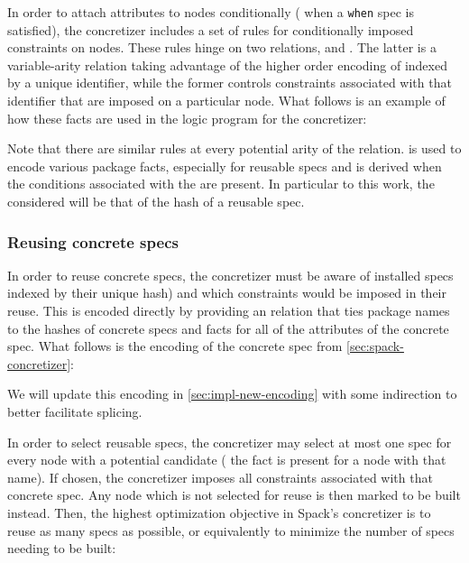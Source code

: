 In order to attach attributes to nodes conditionally (\ie{} when a
\texttt{when} spec is satisfied), the concretizer includes a set of rules for
conditionally imposed constraints on nodes. These rules hinge on two relations,
 and . The latter is a variable-arity
relation taking advantage of the higher order encoding of  indexed by
a unique identifier, while the former controls constraints associated with that
identifier that are imposed on a particular node. What follows is an example of how
these facts are used in the logic program for the concretizer:
\par\vspace{0.8em}\noindent\colorbox{whitesmoke}{\begin{minipage}{0.98\columnwidth}\end{minipage}}\vspace{0.8em}
Note that there are similar rules at every potential arity of the 
relation.  is used to encode various package facts,
especially for reusable specs and  is derived when the conditions
associated with the  are present. In particular to this work, the
 considered will be that of the hash of a reusable spec.

\subsubsection{Reusing concrete specs}
\label{sec:concretizer-reuse}
In order to reuse concrete specs, the concretizer must be aware of installed specs
indexed by their unique hash) and which constraints would
be imposed in their reuse. This is encoded directly by providing an
 relation that ties package names to the hashes of
concrete specs and  facts for all of the attributes
of the concrete spec. What follows is the encoding of the concrete spec from
\cref{sec:spack-concretizer}:
\par\vspace{0.8em}\noindent\colorbox{whitesmoke}{\begin{minipage}{0.98\columnwidth}\end{minipage}}\vspace{0.8em}
We will update this encoding in \cref{sec:impl-new-encoding} with some
indirection to better facilitate splicing.

In order to select reusable specs, the concretizer may select at most one spec
for every node with a potential candidate (\ie{} the  fact
is present for a node with that name). If chosen, the concretizer imposes all
constraints associated with that concrete spec. Any node which is not selected
for reuse is then marked to be built instead. Then, the highest optimization
objective in Spack's concretizer is to reuse as many specs as possible, or
equivalently to minimize the number of specs needing to be built:
\par\vspace{0.8em}\noindent\colorbox{whitesmoke}{\begin{minipage}{0.98\columnwidth}\end{minipage}}\vspace{0.8em}
